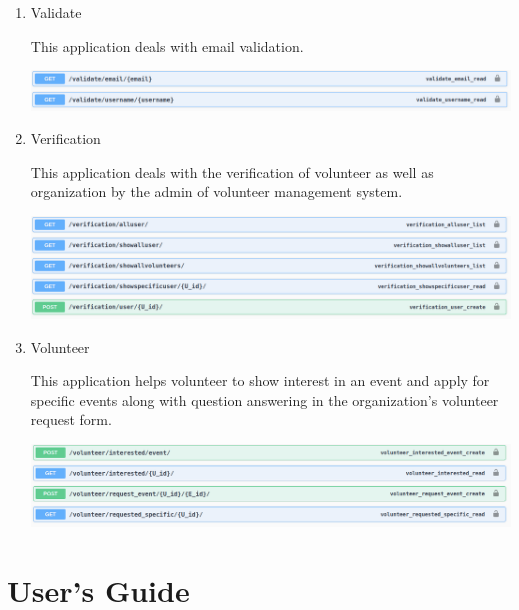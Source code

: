 \documentclass[12pt]{article}
\begin{document}
\begin{enumerate}
	\item Validate

	This application deals with email validation.	
	
	\includegraphics[scale = 0.35]{validate.png}	
	
	\item Verification
	
	This application deals with the verification of volunteer as well as organization by the admin of volunteer management system.
	
	\includegraphics[scale = 0.35]{verification.png}	
	
	\item Volunteer
	
	This application helps volunteer to show interest in an event and apply for specific events along with question answering in the organization's volunteer request form.
	
	\includegraphics[scale = 0.35]{volunteer.png}	
	
\end{enumerate}

\clearpage
\clearpage

\section{User's Guide}
\end{document}
